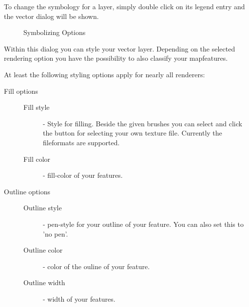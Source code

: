 To change the symbology for a layer, simply double click on its legend
entry and the vector  dialog will be
shown.

\begin{figure}[ht]
\centering
\caption{Symbolizing Options \nixcaption}
   \hspace{1cm}
   \hspace{1cm}
   \hspace{1cm}
\end{figure}


 \label{sec:style_options} 
Within this dialog you can style your vector layer. Depending on the selected
rendering option you have the possibility to also classify your mapfeatures.

At least the following styling options apply for nearly all renderers:
\begin{description}
\item[Fill options]
\begin{description}
 \item[Fill style] - Style for filling. Beside the given brushes you can
 select  and click the \browsebutton
 button for selecting your own texture file. Currently the fileformats
  are supported.
 \item[Fill color] - fill-color of your features.
\end{description}
\item[Outline options]
\begin{description}
 \item[Outline style] - pen-style for your outline of your feature. You can
 also set this to 'no pen'.
 \item[Outline color] - color of the ouline of your feature.
 \item[Outline width] - width of your features.
\end{description}
\end{description}

